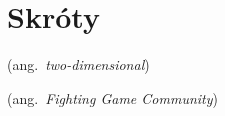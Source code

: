 % 
\chapter*{Skróty}
\label{sec:skroty}
\noindent\vspace{-\topsep-\partopsep-\parsep} 
\begin{description}[labelwidth=*]
  \item [2D] (ang.\ \emph{two-dimensional}) 
	\item [FGC] (ang.~\emph{Fighting Game Community})
\end{description}
